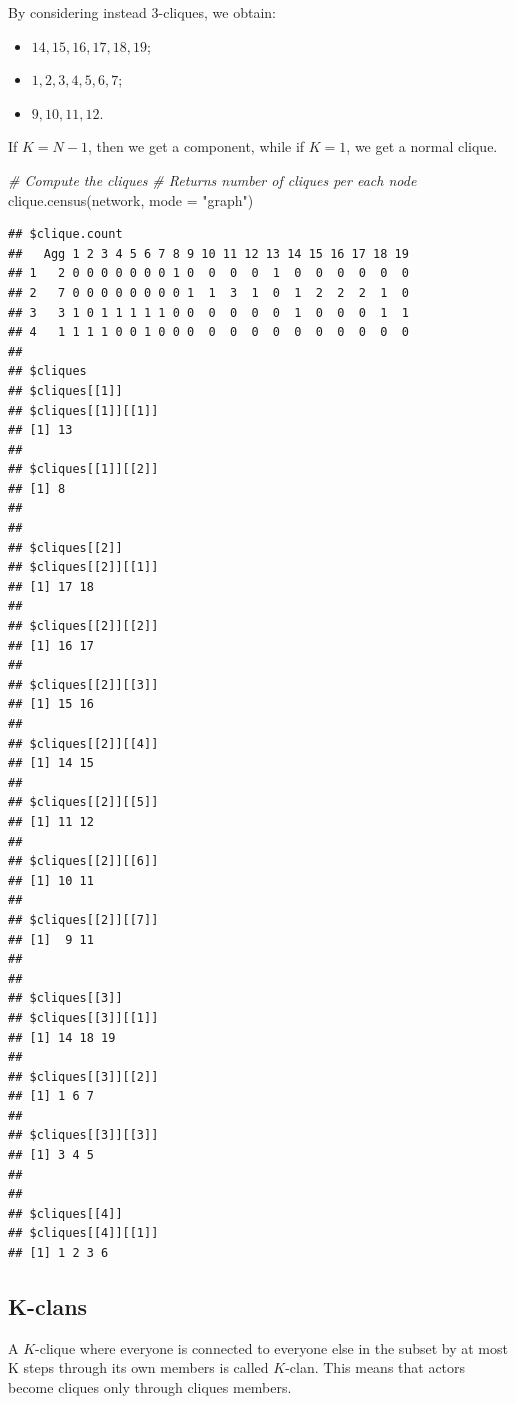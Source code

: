 \documentclass[
  notitlepage,
  onecolumn,
  openany]{book}
\newenvironment{Shaded}{\begin{snugshade}}{\end{snugshade}}
\newcommand{\AttributeTok}[1]{\textcolor[rgb]{0.77,0.63,0.00}{#1}}
\newcommand{\CommentTok}[1]{\textcolor[rgb]{0.56,0.35,0.01}{\textit{#1}}}
\newcommand{\FunctionTok}[1]{\textcolor[rgb]{0.00,0.00,0.00}{#1}}
\newcommand{\NormalTok}[1]{#1}
\newcommand{\StringTok}[1]{\textcolor[rgb]{0.31,0.60,0.02}{#1}}
\providecommand{\tightlist}{%
  \setlength{\itemsep}{0pt}\setlength{\parskip}{0pt}}
\begin{document}
By considering instead 3-cliques, we obtain:

\begin{itemize}
\tightlist
\item
  \(14, 15, 16, 17, 18, 19\);
\item
  \(1, 2, 3, 4, 5, 6, 7\);
\item
  \(9, 10, 11, 12\).
\end{itemize}

If \(K = N-1\), then we get a component, while if \(K=1\), we get a normal clique.

\begin{Shaded}
\begin{Highlighting}[]
\CommentTok{\# Compute the cliques}
\CommentTok{\# Returns number of cliques per each node}
\FunctionTok{clique.census}\NormalTok{(network, }\AttributeTok{mode =} \StringTok{"graph"}\NormalTok{)}
\end{Highlighting}
\end{Shaded}

\begin{verbatim}
## $clique.count
##   Agg 1 2 3 4 5 6 7 8 9 10 11 12 13 14 15 16 17 18 19
## 1   2 0 0 0 0 0 0 0 1 0  0  0  0  1  0  0  0  0  0  0
## 2   7 0 0 0 0 0 0 0 0 1  1  3  1  0  1  2  2  2  1  0
## 3   3 1 0 1 1 1 1 1 0 0  0  0  0  0  1  0  0  0  1  1
## 4   1 1 1 1 0 0 1 0 0 0  0  0  0  0  0  0  0  0  0  0
## 
## $cliques
## $cliques[[1]]
## $cliques[[1]][[1]]
## [1] 13
## 
## $cliques[[1]][[2]]
## [1] 8
## 
## 
## $cliques[[2]]
## $cliques[[2]][[1]]
## [1] 17 18
## 
## $cliques[[2]][[2]]
## [1] 16 17
## 
## $cliques[[2]][[3]]
## [1] 15 16
## 
## $cliques[[2]][[4]]
## [1] 14 15
## 
## $cliques[[2]][[5]]
## [1] 11 12
## 
## $cliques[[2]][[6]]
## [1] 10 11
## 
## $cliques[[2]][[7]]
## [1]  9 11
## 
## 
## $cliques[[3]]
## $cliques[[3]][[1]]
## [1] 14 18 19
## 
## $cliques[[3]][[2]]
## [1] 1 6 7
## 
## $cliques[[3]][[3]]
## [1] 3 4 5
## 
## 
## $cliques[[4]]
## $cliques[[4]][[1]]
## [1] 1 2 3 6
\end{verbatim}

\hypertarget{k-clans}{%
\subsection{K-clans}\label{k-clans}}

A \(K\)-clique where everyone is connected to everyone else in the subset by at most K steps through its own members is called \(K\)-clan. This means that actors become cliques only through cliques members.
\end{document}
